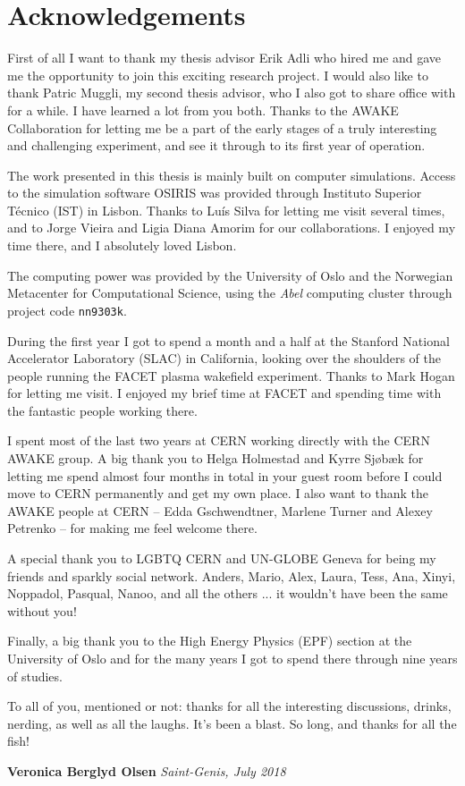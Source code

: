 \chapter*{Acknowledgements}

First of all I want to thank my thesis advisor Erik Adli who hired me and gave me the opportunity to join this exciting research project.
I would also like to thank Patric Muggli, my second thesis advisor, who I also got to share office with for a while.
I have learned a lot from you both.
Thanks to the AWAKE Collaboration for letting me be a part of the early stages of a truly interesting and challenging experiment, and see it through to its first year of operation.

The work presented in this thesis is mainly built on computer simulations.
Access to the simulation software OSIRIS was provided through Instituto Superior Técnico (IST) in Lisbon.
Thanks to Luís Silva for letting me visit several times, and to Jorge Vieira and Ligia Diana Amorim for our collaborations.
I enjoyed my time there, and I absolutely loved Lisbon.

The computing power was provided by the University of Oslo and the Norwegian Metacenter for Computational Science, using the \textit{Abel} computing cluster through project code \texttt{nn9303k}.

During the first year I got to spend a month and a half at the Stanford National Accelerator Laboratory (SLAC) in California, looking over the shoulders of the people running the FACET plasma wakefield experiment.
Thanks to Mark Hogan for letting me visit.
I enjoyed my brief time at FACET and spending time with the fantastic people working there.

I spent most of the last two years at CERN working directly with the CERN AWAKE group.
A big thank you to Helga Holmestad and Kyrre Sjøbæk for letting me spend almost four months in total in your guest room before I could move to CERN permanently and get my own place.
I also want to thank the AWAKE people at CERN -- Edda Gschwendtner, Marlene Turner and Alexey Petrenko -- for making me feel welcome there.

A special thank you to LGBTQ CERN and UN-GLOBE Geneva for being my friends and sparkly social network.
Anders, Mario, Alex, Laura, Tess, Ana, Xinyi, Noppadol, Pasqual, Nanoo, and all the others ... it wouldn't have been the same without you!

Finally, a big thank you to the High Energy Physics (EPF) section at the University of Oslo and for the many years I got to spend there through nine years of studies.

To all of you, mentioned or not: thanks for all the interesting discussions, drinks, nerding, as well as all the laughs.
It's been a blast.
So long, and thanks for all the fish!

\vfill
\null\hfill\textbf{Veronica Berglyd Olsen}
\newline
\null\hfill\textit{Saint-Genis, July 2018}
